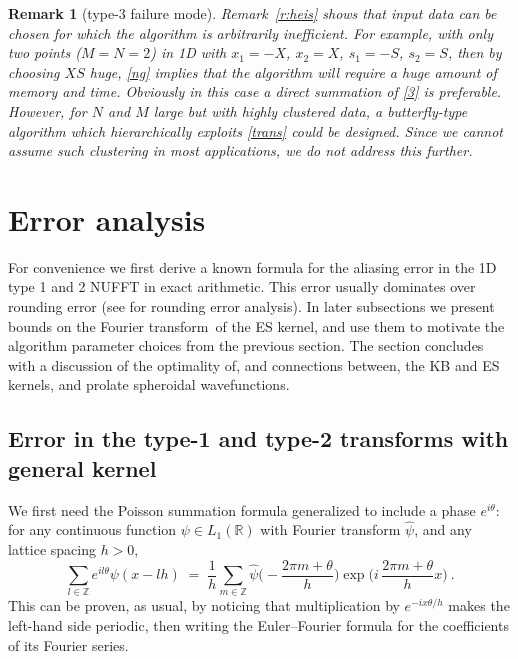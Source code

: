 \documentclass[10pt]{article}
\newcommand{\be}{\begin{equation}}
\newcommand{\ee}{\end{equation}}
\newcommand{\RR}{\mathbb{R}}
\newcommand{\ZZ}{\mathbb{Z}}
\newtheorem{rmk}[thm]{Remark}
\newcommand{\FT}{Fourier transform}
\begin{document}
\begin{rmk}[type-3 failure mode]
  Remark~\ref{r:heis} shows that input data can be chosen for which the
  algorithm is arbitrarily inefficient.
  For example, with only two points ($M=N=2$) in 1D with
  $x_1=-X$, $x_2=X$, $s_1=-S$, $s_2=S$,
  then by choosing $XS$ huge, \eqref{ng} implies that the algorithm
  will require a huge amount of memory and time.
  Obviously in this case a direct summation of \eqref{3} is preferable.
  However, for $N$ and $M$ large but with highly clustered data,
  a butterfly-type algorithm which hierarchically exploits \eqref{trans}
  could be designed. Since we cannot assume such clustering in most
  applications, we do not address this further.
\end{rmk}




\section{Error analysis}
\label{s:err}

For convenience we first derive a known formula
for the aliasing error in the 1D type 1 and 2 NUFFT
in exact arithmetic.
This error usually dominates over rounding error
(see \cite[\S 1.4]{nfftchap} for rounding error analysis).
In later subsections we present bounds on the \FT\ of the ES kernel,
and use them to motivate the algorithm parameter choices from the
previous section.
The section concludes with a discussion of the optimality of,
and connections between, the KB and ES kernels, and prolate spheroidal
wavefunctions.

\subsection{Error in the type-1 and type-2 transforms with general kernel}
\label{s:errgen}

We first need the
Poisson summation formula
\cite[\S 11.22]{apostol} generalized to include a phase $e^{i\theta}$:
for any continuous function
$\psi \in L_1(\RR)$ with Fourier transform $\hat\psi$,
and any lattice spacing $h>0$,
\be
\sum_{l\in\ZZ} e^{il\theta} \psi(x - lh) \; = \;
\frac{1}{h} \sum_{m\in\ZZ}
\hat\psi\biggl(-\frac{2\pi m + \theta}{h}\biggr)
\exp \biggl({i\,\frac{2\pi m + \theta}{h}x}\biggr)
~.
\label{pois}
\ee
This can be proven, as usual, by noticing that multiplication
by $e^{-ix\theta/h}$ makes the left-hand side periodic,
then writing the Euler--Fourier formula for the coefficients of its
Fourier series.
\end{document}
